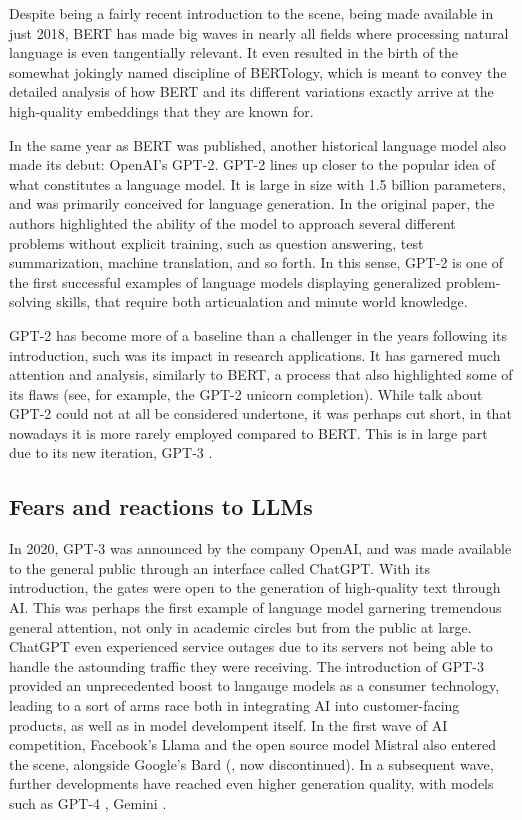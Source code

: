 Despite being a fairly recent introduction to the scene, being made available in just 2018, BERT has made big waves in nearly all fields where processing natural language is even tangentially relevant.
It even resulted in the birth of the somewhat jokingly named discipline of BERTology, which is meant to convey the detailed analysis of how BERT and its different variations exactly arrive at the high-quality embeddings that they are known for.

In the same year as BERT was published, another historical language model also made its debut: OpenAI's GPT-2. \citep{citationneeded}
GPT-2 lines up closer to the popular idea of what constitutes a language model. It is large in size with 1.5 billion parameters, and was primarily conceived for language generation.
In the original paper, the authors highlighted the ability of the model to approach several different problems without explicit training, such as question answering, test summarization, machine translation, and so forth.
In this sense, GPT-2 is one of the first successful examples of language models displaying generalized problem-solving skills, that require both articualation and minute world knowledge.

GPT-2 has become more of a baseline than a challenger in the years following its introduction, such was its impact in research applications. It has garnered much attention and analysis, similarly to BERT, a process that also highlighted some of its flaws (see, for example, the GPT-2 unicorn completion). While talk about GPT-2 could not at all be considered undertone, it was perhaps cut short, in that nowadays it is more rarely employed compared to BERT. This is in large part due to its new iteration, GPT-3 \citep{citationneeded}.

\subsection{Fears and reactions to LLMs}

In 2020, GPT-3 was announced by the company OpenAI, and was made available to the general public through an interface called ChatGPT. With its introduction, the gates were open to the generation of high-quality text through AI.
This was perhaps the first example of language model garnering tremendous general attention, not only in academic circles but from the public at large. ChatGPT even experienced service outages due to its servers not being able to handle the astounding traffic they were receiving.
The introduction of GPT-3 provided an unprecedented boost to langauge models as a consumer technology, leading to a sort of arms race both in integrating AI into customer-facing products, as well as in model develompent itself.
In the first wave of AI competition, Facebook's Llama \citep{touvron2023llama} and the open source model Mistral \citep{jiang2023mistral} also entered the scene, alongside Google's Bard (\citealp{citationneeded}, now discontinued). In a subsequent wave, further developments have reached even higher generation quality, with models such as GPT-4 \citep{citationneeded}, Gemini \citep{citationneeded}.

